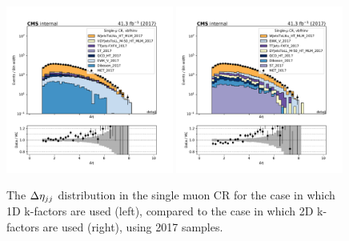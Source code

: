 \begin{figure}
    \begin{center}
        \includegraphics[width=0.49\textwidth]{fig/datamc_1dkfac/cr_1m_vbf/cr_1m_vbf_detajj_losf_2017.pdf}
        \includegraphics[width=0.49\textwidth]{fig/datamc/cr_1m_vbf/cr_1m_vbf_detajj_losf_2017.pdf} 
        \caption{The $\Delta \eta_{jj}$ distribution in the single muon CR for the case in which 1D k-factors are used (left), 
        compared to the case in which 2D k-factors are used (right), using 2017 samples.}
        \label{fig:detajj_2017}
    \end{center}
\end{figure}

